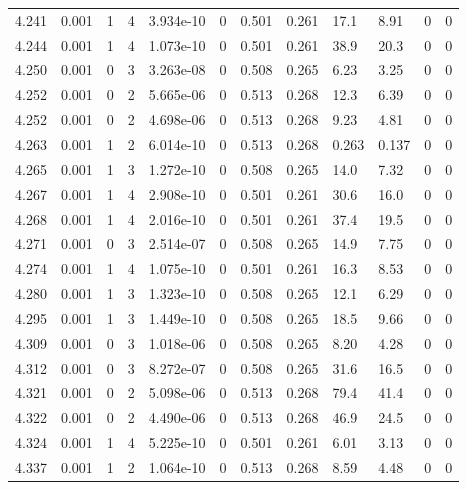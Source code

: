 \documentclass[preview]{standalone}
\begin{document}
{{{{{{{{{{{\begin{tabular}{L{1.2cm}C{1.2cm} C{0.3cm}C{0.5cm} C{1.4cm}C{1.4cm} C{1.4cm}C{1.4cm} C{1.6cm}C{1.6cm} C{1.6cm}C{1.6cm}}
  4.241  &  0.001  & 1     &  4 &  3.934e-10  & 0  &  0.501&   0.261& 17.1 & 8.91   &  0 & 0  \\ 
  4.244  &  0.001  & 1     &  4 &  1.073e-10  & 0  &  0.501&   0.261& 38.9 & 20.3   &  0 & 0  \\ 
  4.250  &  0.001  & 0     &  3 &  3.263e-08  & 0  &  0.508&   0.265& 6.23 & 3.25   &  0 & 0  \\ 
  4.252  &  0.001  & 0     &  2 &  5.665e-06  & 0  &  0.513&   0.268& 12.3 & 6.39   &  0 & 0  \\ 
  4.252  &  0.001  & 0     &  2 &  4.698e-06  & 0  &  0.513&   0.268& 9.23 & 4.81   &  0 & 0  \\ 
  4.263  &  0.001  & 1     &  2 &  6.014e-10  & 0  &  0.513&   0.268& 0.263 & 0.137   &  0 & 0  \\ 
  4.265  &  0.001  & 1     &  3 &  1.272e-10  & 0  &  0.508&   0.265& 14.0 & 7.32   &  0 & 0  \\ 
  4.267  &  0.001  & 1     &  4 &  2.908e-10  & 0  &  0.501&   0.261& 30.6 & 16.0   &  0 & 0  \\ 
  4.268  &  0.001  & 1     &  4 &  2.016e-10  & 0  &  0.501&   0.261& 37.4 & 19.5   &  0 & 0  \\ 
  4.271  &  0.001  & 0     &  3 &  2.514e-07  & 0  &  0.508&   0.265& 14.9 & 7.75   &  0 & 0  \\ 
  4.274  &  0.001  & 1     &  4 &  1.075e-10  & 0  &  0.501&   0.261& 16.3 & 8.53   &  0 & 0  \\ 
  4.280  &  0.001  & 1     &  3 &  1.323e-10  & 0  &  0.508&   0.265& 12.1 & 6.29   &  0 & 0  \\ 
  4.295  &  0.001  & 1     &  3 &  1.449e-10  & 0  &  0.508&   0.265& 18.5 & 9.66   &  0 & 0  \\ 
  4.309  &  0.001  & 0     &  3 &  1.018e-06  & 0  &  0.508&   0.265& 8.20 & 4.28   &  0 & 0  \\ 
  4.312  &  0.001  & 0     &  3 &  8.272e-07  & 0  &  0.508&   0.265& 31.6 & 16.5   &  0 & 0  \\ 
  4.321  &  0.001  & 0     &  2 &  5.098e-06  & 0  &  0.513&   0.268& 79.4 & 41.4   &  0 & 0  \\ 
  4.322  &  0.001  & 0     &  2 &  4.490e-06  & 0  &  0.513&   0.268& 46.9 & 24.5   &  0 & 0  \\ 
  4.324  &  0.001  & 1     &  4 &  5.225e-10  & 0  &  0.501&   0.261& 6.01 & 3.13   &  0 & 0  \\ 
  4.337  &  0.001  & 1     &  2 &  1.064e-10  & 0  &  0.513&   0.268& 8.59 & 4.48   &  0 & 0  \\ 

\end{tabular}}}}}}}}}}}}
\end{document}
